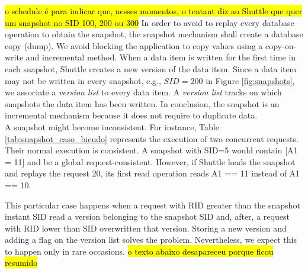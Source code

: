 \hl{o schedule é para indicar que, nesses momentos, o tentant diz ao Shuttle que quer um snapshot no SID 100, 200 ou 300}
In order to avoid to replay every database operation to obtain the snapshot, the snapshot mechanism shall create a database copy (dump). We avoid blocking the application to copy values using a copy-on-write and incremental method. When a data item is written for the first time in each snapshot, Shuttle creates a new version of the data item. Since a data item may not be written in every snapshot, e.g., $SID=200$ in Figure \ref{fig:snapshots}, we associate a \emph{version list} to every data item. A \emph{version list} tracks on which snapshots the data item has been written. In conclusion, the snapshot is an incremental mechanism because it does not require to duplicate data.\\


A snapshot might become inconsistent. For instance, Table \ref{tab:snapshot_caso_bicudo} represents the execution of two concurrent requests. Their normal execution is consistent. A snapshot with \ac{SID}=5 would contain [A1 = 11] and be a global request-consistent. However, if Shuttle loads the snapshot and replays the request 20, its first read operation reads A1 == 11 instead of A1 == 10. 


This particular case happens when a request with \ac{RID} greater than the snapshot instant \ac{SID} read a version belonging to the snapshot \ac{SID} and, after, a request with \ac{RID} lower than \ac{SID} overwritten that version. Storing a new version and adding a flag on the version list solves the problem. Nevertheless, we expect this to happen only in rare occasions. \hl{o texto abaixo desapareceu porque ficou resumido}



